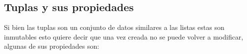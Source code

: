 \begin{itemize}
      \begin{figure}[h]
        \centering
      \end{figure}
\end{itemize}

\subsection{Tuplas y sus propiedades}
Si bien las tuplas son un conjunto de datos similares a las listas estas son inmutables esto quiere decir que una vez creada no se puede volver a modificar, algunas de sus propiedades son:

